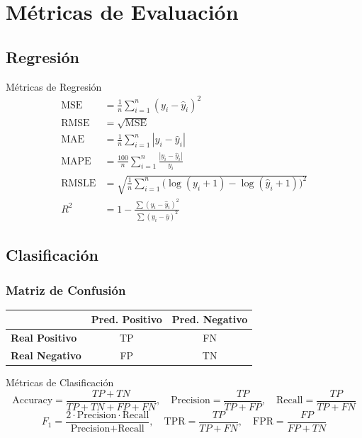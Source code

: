 \documentclass[12pt, a4paper]{article}
\begin{document}
\section{Métricas de Evaluación}

\subsection{Regresión}

\begin{defbox}{Métricas de Regresión}
\begin{align}
  \text{MSE}  &= \frac{1}{n}\sum_{i=1}^{n}(y_i - \hat{y}_i)^2 \\[4pt]
  \text{RMSE} &= \sqrt{\text{MSE}} \\[4pt]
  \text{MAE}  &= \frac{1}{n}\sum_{i=1}^{n}|y_i - \hat{y}_i| \\[4pt]
  \text{MAPE} &= \frac{100}{n}\sum_{i=1}^{n}\frac{|y_i - \hat{y}_i|}{y_i} \\[4pt]
  \text{RMSLE}&= \sqrt{\frac{1}{n}\sum_{i=1}^{n}\bigl(\log(y_i+1)-\log(\hat{y}_i+1)\bigr)^2} \\[4pt]
  R^2         &= 1 - \frac{\sum(y_i-\hat{y}_i)^2}{\sum(y_i-\bar{y})^2}
\end{align}
\end{defbox}

\subsection{Clasificación}

\subsubsection{Matriz de Confusión}

\begin{center}
\begin{tabular}{lcc}
\toprule
 & \textbf{Pred. Positivo} & \textbf{Pred. Negativo} \\
\midrule
\textbf{Real Positivo} & \textcolor{verde}{TP} & \textcolor{rojo}{FN} \\
\textbf{Real Negativo} & \textcolor{rojo}{FP} & \textcolor{verde}{TN} \\
\bottomrule
\end{tabular}
\end{center}

\begin{defbox}{Métricas de Clasificación}
\[
  \text{Accuracy} = \frac{TP+TN}{TP+TN+FP+FN}, \quad
  \text{Precision} = \frac{TP}{TP+FP}, \quad
  \text{Recall} = \frac{TP}{TP+FN}
\]
\[
  F_1 = \frac{2 \cdot \text{Precision} \cdot \text{Recall}}{\text{Precision}+\text{Recall}}, \quad
  \text{TPR} = \frac{TP}{TP+FN}, \quad
  \text{FPR} = \frac{FP}{FP+TN}
\]
\end{defbox}
\end{document}
